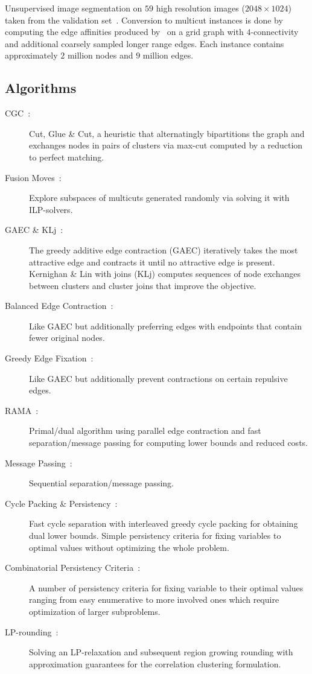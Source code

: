 Unsupervised image segmentation on $59$ high resolution images ($2048 \times 1024$) taken from the validation set~\cite{cordts2016cityscapes}.
Conversion to multicut instances is done by computing the edge affinities produced by~\cite{abbas2021combinatorial} on a grid graph with $4$-connectivity and additional coarsely sampled longer range edges.
Each instance contains approximately $2$ million nodes and $9$ million edges. 

\subsection{Algorithms}
\begin{description}
\item[CGC~\cite{beier2014cut}:] Cut, Glue \& Cut, a heuristic that alternatingly bipartitions the graph and exchanges nodes in pairs of clusters via max-cut computed by a reduction to perfect matching.
\item[Fusion Moves~\cite{beier2017multicut}:] Explore subspaces of multicuts generated randomly via solving it with ILP-solvers.
\item[GAEC \& KLj~\cite{keuper2015efficient}:] The greedy additive edge contraction (GAEC) iteratively takes the most attractive edge and contracts it until no attractive edge is present.
Kernighan \& Lin with joins (KLj) computes sequences of node exchanges between clusters and cluster joins that improve the objective.
\item[Balanced Edge Contraction~\cite{kardoost2018solving}:] Like GAEC but additionally preferring edges with endpoints that contain fewer original nodes.
\item[Greedy Edge Fixation~\cite{levinkov2019comparative}:] Like GAEC but additionally prevent contractions on certain repulsive edges.
\item[RAMA~\cite{abbas2021combinatorial}:] Primal/dual algorithm using parallel edge contraction and fast separation/message passing for computing lower bounds and reduced costs.
\item[Message Passing~\cite{swoboda2017message}:] Sequential separation/message passing.
\item[Cycle Packing \& Persistency~\cite{lange2018partial}:] Fast cycle separation with interleaved greedy cycle packing for obtaining dual lower bounds. Simple persistency criteria for fixing variables to optimal values without optimizing the whole problem.
\item[Combinatorial Persistency Criteria~\cite{lange2019combinatorial}:] A number of persistency criteria for fixing variable to their optimal values ranging from easy enumerative to more involved ones which require optimization of larger subproblems.
\item[LP-rounding~\cite{demaine2006correlation}:]
    Solving an LP-relaxation and subsequent region growing rounding with approximation guarantees for the correlation clustering formulation.
\end{description}

